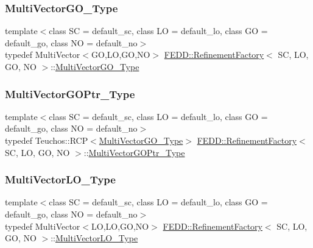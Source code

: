 \subsubsection{\texorpdfstring{Multi\+Vector\+G\+O\+\_\+\+Type}{MultiVectorGO\_Type}}
{\footnotesize\ttfamily template$<$class SC = default\+\_\+sc, class LO = default\+\_\+lo, class GO = default\+\_\+go, class NO = default\+\_\+no$>$ \\
typedef Multi\+Vector$<$GO,LO,GO,NO$>$ \hyperlink{classFEDD_1_1RefinementFactory}{F\+E\+D\+D\+::\+Refinement\+Factory}$<$ SC, LO, GO, NO $>$\+::\hyperlink{classFEDD_1_1RefinementFactory_a433fd79c1903a3771cffbaed6f5dbd71}{Multi\+Vector\+G\+O\+\_\+\+Type}}

\mbox{\label{classFEDD_1_1RefinementFactory_a9e4318c3bc9a63b25f6283955ff80d49}} 
\subsubsection{\texorpdfstring{Multi\+Vector\+G\+O\+Ptr\+\_\+\+Type}{MultiVectorGOPtr\_Type}}
{\footnotesize\ttfamily template$<$class SC = default\+\_\+sc, class LO = default\+\_\+lo, class GO = default\+\_\+go, class NO = default\+\_\+no$>$ \\
typedef Teuchos\+::\+R\+CP$<$\hyperlink{classFEDD_1_1RefinementFactory_a433fd79c1903a3771cffbaed6f5dbd71}{Multi\+Vector\+G\+O\+\_\+\+Type}$>$ \hyperlink{classFEDD_1_1RefinementFactory}{F\+E\+D\+D\+::\+Refinement\+Factory}$<$ SC, LO, GO, NO $>$\+::\hyperlink{classFEDD_1_1RefinementFactory_a9e4318c3bc9a63b25f6283955ff80d49}{Multi\+Vector\+G\+O\+Ptr\+\_\+\+Type}}

\mbox{\label{classFEDD_1_1RefinementFactory_ae731f05f6a28d13f917230f914f29037}} 
\subsubsection{\texorpdfstring{Multi\+Vector\+L\+O\+\_\+\+Type}{MultiVectorLO\_Type}}
{\footnotesize\ttfamily template$<$class SC = default\+\_\+sc, class LO = default\+\_\+lo, class GO = default\+\_\+go, class NO = default\+\_\+no$>$ \\
typedef Multi\+Vector$<$LO,LO,GO,NO$>$ \hyperlink{classFEDD_1_1RefinementFactory}{F\+E\+D\+D\+::\+Refinement\+Factory}$<$ SC, LO, GO, NO $>$\+::\hyperlink{classFEDD_1_1RefinementFactory_ae731f05f6a28d13f917230f914f29037}{Multi\+Vector\+L\+O\+\_\+\+Type}}

